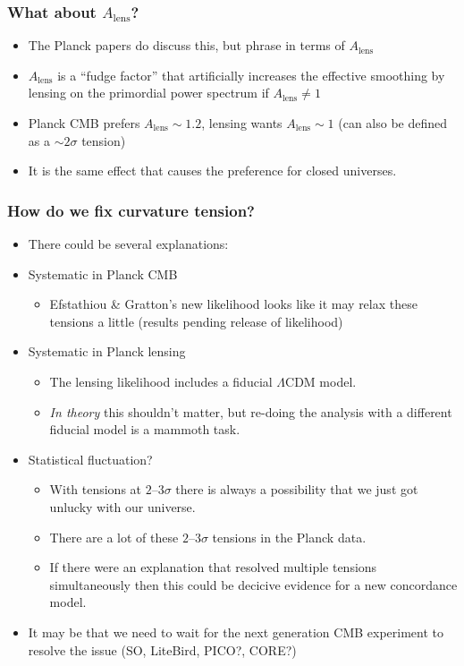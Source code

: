 \documentclass[%
]{beamer}
\begin{document}
\begin{frame}
    \frametitle{What about $A_\mathrm{lens}$?}
    \begin{itemize}
        \item The Planck papers do discuss this, but phrase in terms of $A_\mathrm{lens}$
        \item $A_\mathrm{lens}$ is a ``fudge factor'' that artificially increases the effective smoothing by lensing on the primordial power spectrum if $A_\mathrm{lens}\ne 1$
        \item Planck CMB prefers $A_\mathrm{lens}\sim1.2$, lensing wants $A_\mathrm{lens}\sim1$ (can also be defined as a $\sim2\sigma$ tension)
        \item It is the same effect that causes the preference for closed universes.
    \end{itemize}
\end{frame}

\begin{frame}
    \frametitle{How do we fix curvature tension?}
    \begin{itemize}
        \item There could be several explanations:
        \item Systematic in Planck CMB
            \begin{itemize}
                \item Efstathiou \& Gratton's new likelihood looks like it may relax these tensions a little (results pending release of likelihood)
            \end{itemize}
        \item Systematic in Planck lensing
            \begin{itemize}
                \item The lensing likelihood includes a fiducial $\Lambda$CDM model.
                \item {\em In theory\/} this shouldn't matter, but re-doing the analysis with a different fiducial model is a mammoth task.
            \end{itemize}
        \item Statistical fluctuation?
            \begin{itemize}
                \item With tensions at $2$--$3\sigma$ there is always a possibility that we just got unlucky with our universe.
                \item There are a lot of these $2$--$3\sigma$ tensions in the Planck data. 
                \item If there were an explanation that resolved multiple tensions simultaneously then this could be decicive evidence for a new concordance model.
            \end{itemize}
        \item It may be that we need to wait for the next generation CMB experiment to resolve the issue (SO, LiteBird, PICO?, CORE?)
    \end{itemize}
\end{frame}
\end{document}
